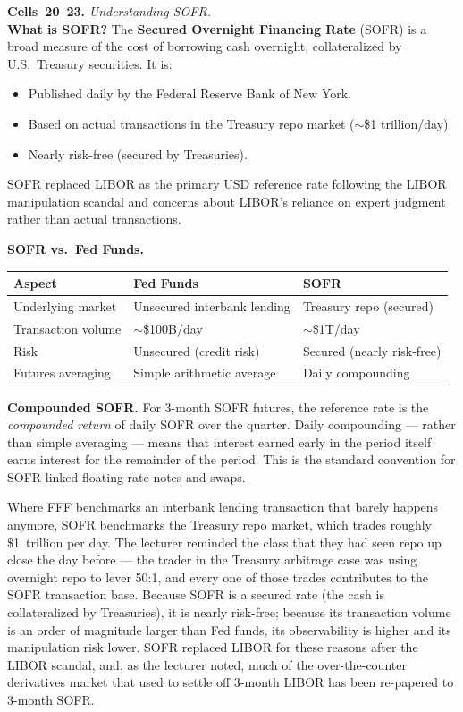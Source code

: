 \begin{keyblock}
\textbf{Cells~20--23.} \emph{Understanding SOFR.}\\
\textbf{What is SOFR?} The \textbf{Secured Overnight Financing Rate}
(SOFR) is a broad measure of the cost of borrowing cash overnight,
collateralized by U.S.~Treasury securities. It is:
\begin{itemize}
  \item Published daily by the Federal Reserve Bank of New York.
  \item Based on actual transactions in the Treasury repo market
        ($\sim$\$1 trillion/day).
  \item Nearly risk-free (secured by Treasuries).
\end{itemize}
SOFR replaced LIBOR as the primary USD reference rate following the LIBOR
manipulation scandal and concerns about LIBOR's reliance on expert
judgment rather than actual transactions.

\textbf{SOFR vs.\ Fed Funds.}
\begin{center}
\begin{tabular}{lll}
\toprule
\textbf{Aspect} & \textbf{Fed Funds} & \textbf{SOFR} \\
\midrule
Underlying market & Unsecured interbank lending & Treasury repo (secured) \\
Transaction volume & $\sim$\$100B/day & $\sim$\$1T/day \\
Risk & Unsecured (credit risk) & Secured (nearly risk-free) \\
Futures averaging & Simple arithmetic average & Daily compounding \\
\bottomrule
\end{tabular}
\end{center}

\textbf{Compounded SOFR.} For 3-month SOFR futures, the reference rate is
the \emph{compounded return} of daily SOFR over the quarter. Daily
compounding --- rather than simple averaging --- means that interest
earned early in the period itself earns interest for the remainder of the
period. This is the standard convention for SOFR-linked floating-rate
notes and swaps.
\end{keyblock}

Where FFF benchmarks an interbank lending transaction that barely happens
anymore, SOFR benchmarks the Treasury repo market, which trades roughly
\$1~trillion per day. The lecturer reminded the class that they had seen
repo up close the day before --- the trader in the Treasury arbitrage case
was using overnight repo to lever 50:1, and every one of those trades
contributes to the SOFR transaction base. Because SOFR is a secured rate
(the cash is collateralized by Treasuries), it is nearly risk-free; because
its transaction volume is an order of magnitude larger than Fed funds, its
observability is higher and its manipulation risk lower. SOFR replaced
LIBOR for these reasons after the LIBOR scandal, and, as the lecturer
noted, much of the over-the-counter derivatives market that used to settle
off 3-month LIBOR has been re-papered to 3-month SOFR.

